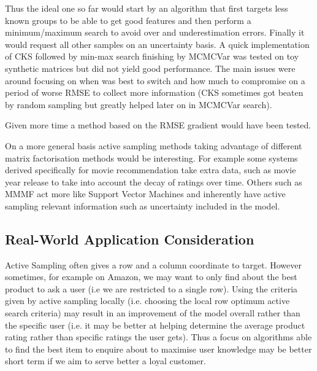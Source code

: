Thus the ideal one so far would start by an algorithm that first targets less known groups to be able to get good features and then perform a minimum/maximum search to avoid over and underestimation errors. Finally it would request all other samples on an uncertainty basis. A quick implementation of CKS followed by min-max search finishing by MCMCVar was tested on toy synthetic matrices but did not yield good performance. The main issues were around focusing on when was best to switch and how much to compromise on a period of worse RMSE to collect more information (CKS sometimes got beaten by random sampling but greatly helped later on in MCMCVar search).

Given more time a method based on the RMSE gradient would have been tested.


On a more general basis active sampling methods taking advantage of different matrix factorisation methods would be interesting. For example some systems derived specifically for movie recommendation take extra data, such as movie year release to take into account the decay of ratings over time. Others such as MMMF act more like Support Vector Machines \cite{active-mf} and inherently have active sampling relevant information such as uncertainty included in the model. 


\subsection{Real-World Application Consideration}
Active Sampling often gives a row and a column coordinate to target. However sometimes, for example on Amazon, we may want to only find about the best product to ask a user (i.e we are restricted to a single row). Using the criteria given by active sampling locally (i.e. choosing the local row optimum active search criteria) may result in an improvement of the model overall rather than the specific user (i.e. it may be better at helping determine the average product rating rather than specific ratings the user gets). Thus a focus on algorithms able to find the best item to enquire about to maximise user knowledge may be better short term if we aim to serve better a loyal customer.



